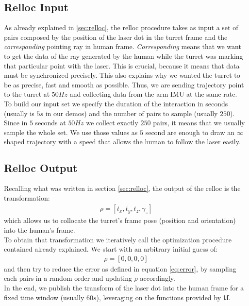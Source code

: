 \subsection{Relloc Input}
As already explained in \ref{sec:relloc}, the relloc procedure takes as input a set of pairs composed by the position of the laser dot in the turret frame and the \emph{corresponding} pointing ray in human frame. \emph{Corresponding} means that we want to get the data of the ray generated by the human while the turret was marking that particular point with the laser. This is crucial, because it means that data must be synchronized precisely. This also explains why we wanted the turret to be  as precise, fast and smooth as possible. Thus, we are sending trajectory point to the turret at $50 Hz$ and collecting data from the arm IMU at the same rate.\\
To build our input set we specify the duration of the interaction in seconds (usually is $5s$ in our demos) and the number of pairs to sample (usually $250$). Since in $5$ seconds at $50 Hz$ we collect exactly $250$ pairs, it means that we usually sample the whole set. We use those values as $5$ second are enough to draw an $\infty$ shaped trajectory with a speed that allows the human to follow the laser easily.
\subsection{Relloc Output}
Recalling what was written in section \ref{sec:relloc}, the output of the relloc is the transformation:
\begin{align}
	\rho = [t_x, t_y, t_z, \gamma_z] \nonumber
\end{align}
which allows us to collocate the turret's frame pose (position and orientation) into the human's frame.\\
To obtain that transformation we iteratively call the optimization procedure contained already explained. We start with an arbitrary initial guess of:
\begin{align}
	\rho = [0, 0, 0, 0] \nonumber
\end{align}
and then try to reduce the error as defined in equation \ref{eq:error}, by sampling each pairs in a random order and updating $\rho$ accordingly.\\
In the end, we publish the transform of the laser dot into the human frame for a fixed time window (usually $60s$), leveraging on the functions provided by \textbf{tf}.
